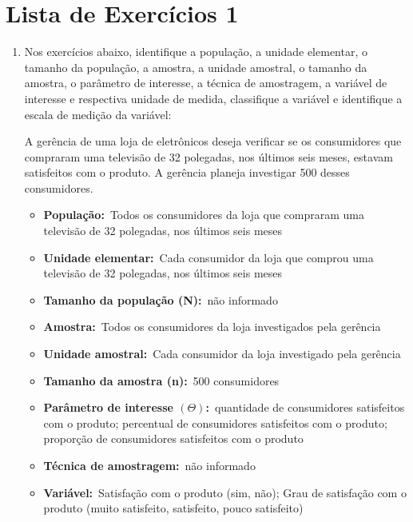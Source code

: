 \chapter{Lista de Exercícios 1}

\begin{enumerate}
	\item Nos exercícios abaixo, identifique a população, a unidade elementar, o tamanho da	população, a amostra, a unidade amostral, o tamanho da amostra, o parâmetro de interesse, a técnica de amostragem, a variável de interesse e respectiva unidade de medida, classifique a variável e identifique a escala de medição da variável:
	
	\subitem A gerência de uma loja de eletrônicos deseja verificar se os consumidores que compraram uma televisão de 32 polegadas, nos últimos seis meses, estavam satisfeitos com o produto. A gerência planeja investigar 500 desses consumidores.
	
	\begin{itemize}	
		\item \textbf{População:}~Todos os consumidores da loja que compraram uma televisão de 32 polegadas, nos últimos seis meses
		
		\item \textbf{Unidade elementar:}~Cada consumidor da loja que comprou uma televisão de 32 polegadas, nos
últimos seis meses
		
		\item \textbf{Tamanho da população (N):}~não informado
		
		\item \textbf{Amostra:}~Todos os consumidores da loja investigados pela gerência
		
		\item \textbf{Unidade amostral:}~Cada consumidor da loja investigado pela gerência
		
		\item \textbf{Tamanho da amostra (n):}~500 consumidores
		
		\item \textbf{Parâmetro de interesse $\left(\varTheta\right)$:}~quantidade de consumidores satisfeitos com o produto; percentual de
consumidores satisfeitos com o produto; proporção de consumidores satisfeitos com o produto
		
		\item \textbf{Técnica de amostragem:}~não informado
		
		\item \textbf{Variável:}~Satisfação com o produto (sim, não); Grau de satisfação com o produto (muito satisfeito,
satisfeito, pouco satisfeito)
		

\end{itemize}
\end{enumerate}
